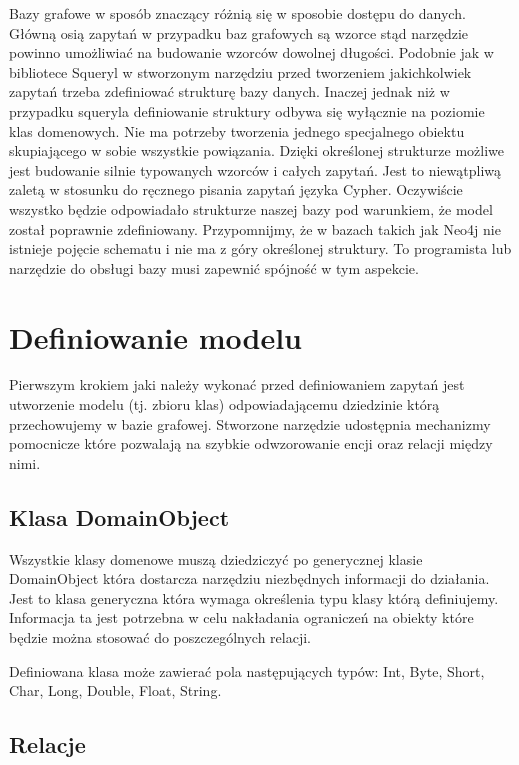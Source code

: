 \documentclass[brudnopis]{xmgr}
\begin{document}
Bazy grafowe w sposób znaczący różnią się w sposobie dostępu do danych. Główną osią zapytań w przypadku baz grafowych są wzorce stąd narzędzie powinno umożliwiać na budowanie wzorców dowolnej długości. Podobnie jak w bibliotece Squeryl w stworzonym narzędziu przed tworzeniem jakichkolwiek zapytań trzeba zdefiniować strukturę bazy danych. Inaczej jednak niż w przypadku squeryla definiowanie struktury odbywa się wyłącznie na poziomie klas domenowych. Nie ma potrzeby tworzenia jednego specjalnego obiektu skupiającego w sobie wszystkie powiązania. Dzięki określonej strukturze możliwe jest budowanie silnie typowanych wzorców i całych zapytań. Jest to niewątpliwą zaletą w stosunku do ręcznego pisania zapytań języka Cypher. Oczywiście wszystko będzie odpowiadało strukturze naszej bazy pod warunkiem, że model został poprawnie zdefiniowany. Przypomnijmy, że w bazach takich jak Neo4j nie istnieje pojęcie schematu i nie ma z góry określonej struktury. To programista lub narzędzie do obsługi bazy musi zapewnić spójność w tym aspekcie.

\section{Definiowanie modelu}

Pierwszym krokiem jaki należy wykonać przed definiowaniem zapytań jest utworzenie modelu (tj. zbioru klas) odpowiadającemu dziedzinie którą przechowujemy w bazie grafowej. Stworzone narzędzie udostępnia mechanizmy pomocnicze które pozwalają na szybkie odwzorowanie encji oraz relacji między nimi.

\subsection{Klasa DomainObject}

Wszystkie klasy domenowe muszą dziedziczyć po generycznej klasie DomainObject która dostarcza narzędziu niezbędnych informacji do działania. Jest to klasa generyczna która wymaga określenia typu klasy którą definiujemy. Informacja ta jest potrzebna w celu nakładania ograniczeń na obiekty które będzie można stosować do poszczególnych relacji.

Definiowana klasa może zawierać pola następujących typów: Int, Byte, Short, Char, Long, Double, Float, String.

\subsection{Relacje}
\end{document}
